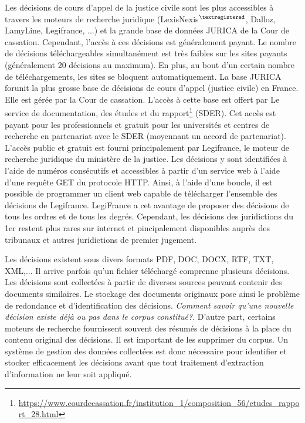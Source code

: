 Les décisions de cours d'appel de la justice civile sont les plus accessibles à travers les moteurs de recherche juridique (LexisNexis$^{\textregistered}$, 
Dalloz\textregistered, LamyLine\textregistered, Legifrance\textregistered, ...) et la grande base de données JURICA de la Cour de cassation. Cependant, l'accès à ces décisions est généralement payant. Le nombre de décisions téléchargeables simultanément est très faibles sur les sites payants (généralement 20 décisions au maximum). En plus, au bout d'un certain nombre de téléchargements, les sites se bloquent automatiquement. La base JURICA forunit la plus grosse base de décisions de cours d'appel (justice civile) en France. Elle est gérée par la Cour de cassation. L'accès à cette base est offert par Le service de documentation, des études et du rapport\footnote{\url{https://www.courdecassation.fr/institution_1/composition_56/etudes_rapport_28.html}} (SDER). Cet accès est payant pour les professionnels et gratuit pour les universités et centres de recherche en partenariat avec le SDER (moyennant un accord de partenariat). L'accès public et gratuit est fourni principalement par Legifrance, le moteur de recherche juridique du ministère de la justice. Les décisions y sont identifiées à l'aide de numéros consécutifs et accessibles à partir d'un service web à l'aide d'une requête GET du protocole HTTP. Ainsi, à l'aide d'une boucle, il est possible de programmer un client web capable de télécharger l'ensemble des décisions de Legifrance. LegiFrance a cet avantage de proposer des décisions de tous les ordres et de tous les degrés. Cependant, les décisions des juridictions du 1er restent plus rares sur internet et pincipalement disponibles auprès des tribunaux et autres juridictions de premier jugement.

Les décisions existent sous divers formats PDF, DOC, DOCX, RTF, TXT, XML,... Il arrive parfois qu'un fichier téléchargé comprenne plusieurs décisions. Les décisions sont collectées à partir de diverses sources peuvant contenir des documents similaires. Le stockage des documents originaux pose ainsi le problème de redondance et d'identification des décisions. \textit{Comment savoir qu'une nouvelle décision existe déjà ou pas dans le corpus constitué?}. D'autre part, certains moteurs de recherche fournissent souvent des résumés de décisions à la place du contenu original des décisions. Il est important de les supprimer du corpus. Un système de gestion des données collectées est donc nécessaire pour identifier et stocker efficacement les décisions avant que tout traitement d'extraction d'information ne leur soit appliqué.

